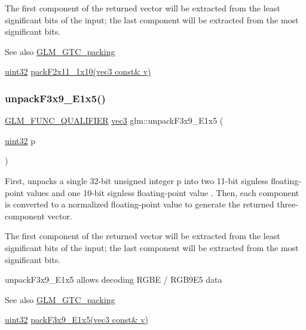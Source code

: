 The first component of the returned vector will be extracted from the least significant bits of the input; the last component will be extracted from the most significant bits.

\begin{DoxySeeAlso}{See also}
\hyperlink{group__gtc__packing}{G\+L\+M\+\_\+\+G\+T\+C\+\_\+packing} 

\hyperlink{group__gtc__type__precision_ga202b6a53c105fcb7e531f9b443518451}{uint32} \hyperlink{group__gtc__packing_ga8c2a0eeee677ca4dafd9e093d9e81062}{pack\+F2x11\+\_\+1x10(vec3 const\& v)} 
\end{DoxySeeAlso}
\mbox{\label{group__gtc__packing_ga15d8845a31e1e55d493803d0c8cb5910}} 
\subsubsection{\texorpdfstring{unpack\+F3x9\+\_\+\+E1x5()}{unpackF3x9\_E1x5()}}
{\footnotesize\ttfamily \hyperlink{setup_8hpp_a33fdea6f91c5f834105f7415e2a64407}{G\+L\+M\+\_\+\+F\+U\+N\+C\+\_\+\+Q\+U\+A\+L\+I\+F\+I\+ER} \hyperlink{group__core__types_ga1c47e8b3386109bc992b6c48e91b0be7}{vec3} glm\+::unpack\+F3x9\+\_\+\+E1x5 (\begin{DoxyParamCaption}\item[{\hyperlink{group__gtc__type__precision_ga202b6a53c105fcb7e531f9b443518451}{uint32}}]{p }\end{DoxyParamCaption})}

First, unpacks a single 32-\/bit unsigned integer p into two 11-\/bit signless floating-\/point values and one 10-\/bit signless floating-\/point value . Then, each component is converted to a normalized floating-\/point value to generate the returned three-\/component vector.

The first component of the returned vector will be extracted from the least significant bits of the input; the last component will be extracted from the most significant bits.

unpack\+F3x9\+\_\+\+E1x5 allows decoding R\+G\+BE / R\+G\+B9\+E5 data

\begin{DoxySeeAlso}{See also}
\hyperlink{group__gtc__packing}{G\+L\+M\+\_\+\+G\+T\+C\+\_\+packing} 

\hyperlink{group__gtc__type__precision_ga202b6a53c105fcb7e531f9b443518451}{uint32} \hyperlink{group__gtc__packing_ga0984f9598edc648d59a9643d9a61b121}{pack\+F3x9\+\_\+\+E1x5(vec3 const\& v)} 
\end{DoxySeeAlso}
\mbox{\label{group__gtc__packing_ga30d6b2f1806315bcd6047131f547d33b}} 
